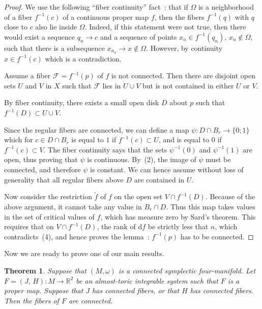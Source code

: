 \documentclass[11pt]{article}
\newtheorem{theorem}{Theorem}[section]
\newcommand{\DD}{\mathrm{d}}
\begin{document}
\begin{proof}
  We use the following ``fiber continuity'' fact~: that if $\Omega$ is
  a neighborhood of a fiber $f^{-1}(c)$ of a continuous proper map
  $f$, then the fibers $f^{-1}(q)$ with $q$ close to $c$ also lie
  inside $\Omega$.  Indeed, if this statement were not true, then
  there would exist a sequence $q_n\rightarrow c$ and a sequence of
  points $x_n \in f^{-1}(q_n)$, $x_{n} \notin \Omega$, such that there
  is a subsequence $x_{n_k} \rightarrow x \notin \Omega$. However, by
  continuity $x\in f^{-1}(c)$ which is a contradiction.

  Assume a fiber $\mathcal{F}=f^{-1}(p)$ of $f$ is not connected. Then
  there are disjoint open sets $U$ and $V$ in $X$ such that
  $\mathcal{F}$ lies in $U \cup V$ but is not contained in either $U$
  or $V$.

  By fiber continuity, there exists a small open disk $D$ about $p$
  such that $f^{-1}(D)\subset U\cup V$.

  Since the regular fibers are connected, we can define a map $\psi:
  D\cap B_r\to\{0;1\}$ which for $c\in D\cap B_r$ is equal to $1$ if
  $f^{-1}(c)\subset U$, and is equal to $0$ if $f^{-1}(c)\subset
  V$. The fiber continuity says that the sets $\psi^{-1}(0)$ and
  $\psi^{-1}(1)$ are open, thus proving that $\psi$ is
  continuous. By~(2), the image of $\psi$ must be connected, and
  therefore $\psi$ is constant. We can hence assume without loss of
  generality that all regular fibers above $D$ are contained in $U$.

  Now consider the restriction $\tilde{f}$ of $f$ on the open set
  $V\cap f^{-1}(D)$. Because of the above argument, it cannot take any
  value in $B_r\cap D$. Thus this map takes values in the set of
  critical values of $f$, which has measure zero by Sard's
  theorem. This requires that on $V\cap f^{-1}(D)$, the rank of $\DD
  f$ be strictly less that $n$, which contradicts~(4), and hence
  proves the lemma~: $f^{-1}(p)$ has to be connected.
\end{proof}










Now we are ready to prove one of our main results.

\begin{theorem} \label{theo:fibers} Suppose that $(M, \omega)$ is a
  connected symplectic four-manifold. Let $F=(J,\,H) \colon M \to
  \mathbb{R}^2$ be an almost\--toric integrable system such that $F$
  is a proper map. Suppose that $J$ has connected fibers, or that $H$
  has connected fibers.  Then the fibers of $F$ are connected.
\end{theorem}
\end{document}
